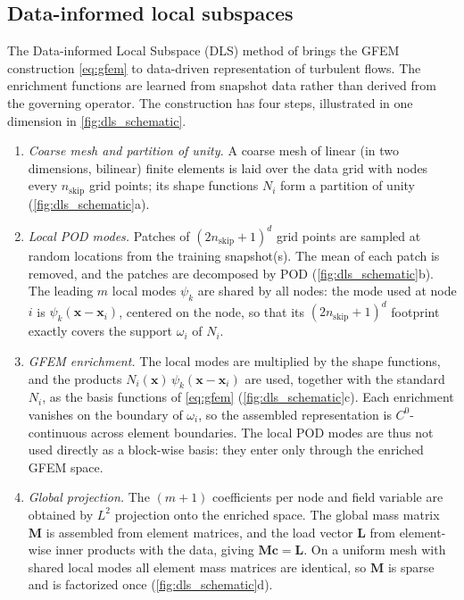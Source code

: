 \subsection{Data-informed local subspaces}
\label{sec:dls}

The Data-informed Local Subspace (DLS) method of \textcite{deshmukh2020dls}
brings the GFEM construction \eqref{eq:gfem} to data-driven representation of
turbulent flows. The enrichment functions are learned from snapshot data rather
than derived from the governing operator. The construction has four steps,
illustrated in one dimension in \cref{fig:dls_schematic}.
\begin{enumerate}[leftmargin=2.2em,itemsep=2pt]
  \item \emph{Coarse mesh and partition of unity.} A coarse mesh of linear (in
  two dimensions, bilinear) finite elements is laid over the data grid with
  nodes every $n_{\mathrm{skip}}$ grid points; its shape functions $N_i$ form
  a partition of unity (\cref{fig:dls_schematic}a).
  \item \emph{Local POD modes.} Patches of $(2n_{\mathrm{skip}}+1)^{d}$ grid
  points are sampled at random locations from the training snapshot(s). The
  mean of each patch is removed, and the patches are decomposed by POD
  (\cref{fig:dls_schematic}b). The leading $m$ local modes $\psi_k$ are shared
  by all nodes: the mode used at node $i$ is $\psi_k(\bm{x}-\bm{x}_i)$,
  centered on the node, so that its $(2n_{\mathrm{skip}}+1)^{d}$ footprint
  exactly covers the support $\omega_i$ of $N_i$.
  \item \emph{GFEM enrichment.} The local modes are multiplied by the shape
  functions, and the products $N_i(\bm{x})\,\psi_k(\bm{x}-\bm{x}_i)$ are used,
  together with the standard $N_i$, as the basis functions of \eqref{eq:gfem}
  (\cref{fig:dls_schematic}c). Each enrichment vanishes on the boundary of
  $\omega_i$, so the assembled representation is $C^{0}$-continuous across
  element boundaries. The local POD modes are thus not used directly as a
  block-wise basis: they enter only through the enriched GFEM space.
  \item \emph{Global projection.} The $(m+1)$ coefficients per node and field
  variable are obtained by $L^2$ projection onto the enriched space. The global
  mass matrix $\bm{M}$ is assembled from element matrices, and the load vector
  $\bm{L}$ from element-wise inner products with the data, giving
  $\bm{M}\bm{c}=\bm{L}$. On a uniform mesh with shared local modes all
  element mass matrices are identical, so $\bm{M}$ is sparse and is factorized
  once (\cref{fig:dls_schematic}d).
\end{enumerate}

